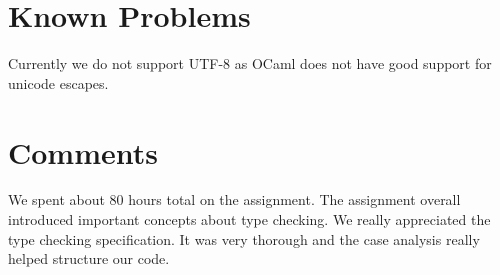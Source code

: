 \documentclass{hw}
\begin{document}
\section{Known Problems}\label{sec:problems}
Currently we do not support UTF-8 as OCaml does not have good support for unicode
escapes.

\section{Comments}\label{sec:comments}
We spent about 80 hours total on the assignment. The assignment overall
introduced important concepts about type checking. We really appreciated
the type checking specification. It was very thorough and the case analysis
really helped structure our code.
\end{document}
